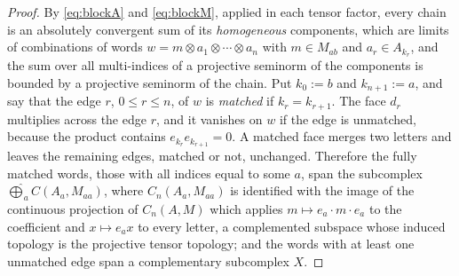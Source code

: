 \documentclass[11pt]{amsart}
\theoremstyle{definition}
\theoremstyle{remark}
\begin{document}
\begin{proof}
By \eqref{eq:blockA} and \eqref{eq:blockM}, applied in each tensor factor,
every chain is an absolutely convergent sum of its \emph{homogeneous}
components, which are limits of combinations of words $w=m\otimes
a_1\otimes\cdots\otimes a_n$ with $m\in M_{ab}$ and $a_r\in A_{k_r}$, and the
sum over all multi-indices of a projective seminorm of the components is
bounded by a projective seminorm of the chain.  Put $k_0:=b$ and
$k_{n+1}:=a$, and say that the edge $r$, $0\le r\le n$, of $w$ is
\emph{matched} if $k_r=k_{r+1}$.  The face $d_r$ multiplies across the edge
$r$, and it vanishes on $w$ if the edge is unmatched, because the product
contains $e_{k_r}e_{k_{r+1}}=0$.  A matched face merges two letters and leaves
the remaining edges, matched or not, unchanged.  Therefore the fully matched
words, those with all indices equal to some $a$, span the subcomplex
$\widehat\bigoplus_aC(A_a,M_{aa})$, where $C_n(A_a,M_{aa})$ is identified with
the image of the continuous projection of $C_n(A,M)$ which applies
$m\mapsto e_a\cdot m\cdot e_a$ to the coefficient and $x\mapsto e_ax$ to
every letter, a complemented subspace whose induced topology is the
projective tensor topology; and the words with at least one unmatched
edge span a complementary subcomplex $X$.


\end{proof}
\end{document}
